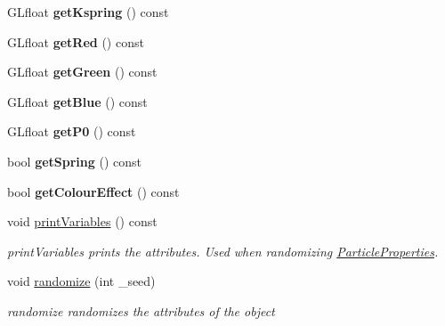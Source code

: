 \begin{DoxyCompactItemize}
\item 
\hypertarget{classParticleProperties_a31a3825b69b29db36087eddcfcee315e}{G\-Lfloat {\bfseries get\-Kspring} () const }\label{classParticleProperties_a31a3825b69b29db36087eddcfcee315e}

\item 
\hypertarget{classParticleProperties_a53b2dfc0c3c78a0104a1791d0b977c8b}{G\-Lfloat {\bfseries get\-Red} () const }\label{classParticleProperties_a53b2dfc0c3c78a0104a1791d0b977c8b}

\item 
\hypertarget{classParticleProperties_a6f50c8d89a1d66940375261b239bb8a6}{G\-Lfloat {\bfseries get\-Green} () const }\label{classParticleProperties_a6f50c8d89a1d66940375261b239bb8a6}

\item 
\hypertarget{classParticleProperties_a9f44172411197d3bf972dab70c45838d}{G\-Lfloat {\bfseries get\-Blue} () const }\label{classParticleProperties_a9f44172411197d3bf972dab70c45838d}

\item 
\hypertarget{classParticleProperties_a00fb572953359318f908c5550623de99}{G\-Lfloat {\bfseries get\-P0} () const }\label{classParticleProperties_a00fb572953359318f908c5550623de99}

\item 
\hypertarget{classParticleProperties_a77a36791ca589cc5e2e25cda1e05ae44}{bool {\bfseries get\-Spring} () const }\label{classParticleProperties_a77a36791ca589cc5e2e25cda1e05ae44}

\item 
\hypertarget{classParticleProperties_a9fef64994d9b7d77bd3b2da3ac2fa9ae}{bool {\bfseries get\-Colour\-Effect} () const }\label{classParticleProperties_a9fef64994d9b7d77bd3b2da3ac2fa9ae}

\item 
\hypertarget{classParticleProperties_a4a9760c2c8b48ed4b83c9561a34a594d}{void \hyperlink{classParticleProperties_a4a9760c2c8b48ed4b83c9561a34a594d}{print\-Variables} () const }\label{classParticleProperties_a4a9760c2c8b48ed4b83c9561a34a594d}

\begin{DoxyCompactList}\small\item\em print\-Variables prints the attributes. Used when randomizing \hyperlink{classParticleProperties}{Particle\-Properties}. \end{DoxyCompactList}\item 
void \hyperlink{classParticleProperties_ad19947a218ea62516bc5f0975fb86d87}{randomize} (int \-\_\-seed)
\begin{DoxyCompactList}\small\item\em randomize randomizes the attributes of the object \end{DoxyCompactList}\end{DoxyCompactItemize}



